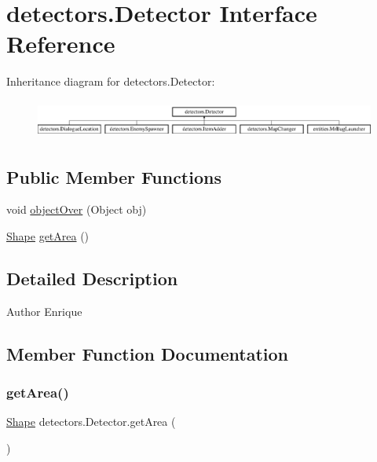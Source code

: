 \hypertarget{interfacedetectors_1_1_detector}{}\section{detectors.\+Detector Interface Reference}
\label{interfacedetectors_1_1_detector}
Inheritance diagram for detectors.\+Detector\+:\begin{figure}[H]
\begin{center}
\leavevmode
\includegraphics[height=1.287356cm]{interfacedetectors_1_1_detector}
\end{center}
\end{figure}
\subsection*{Public Member Functions}
\begin{DoxyCompactItemize}
\item 
void \mbox{\hyperlink{interfacedetectors_1_1_detector_ab35eeb78e8216f8100d4651993668d44}{object\+Over}} (Object obj)
\item 
\mbox{\hyperlink{classorg_1_1newdawn_1_1slick_1_1geom_1_1_shape}{Shape}} \mbox{\hyperlink{interfacedetectors_1_1_detector_a0b2ecb13c6db0ff6a02e57c193bcf8b2}{get\+Area}} ()
\end{DoxyCompactItemize}


\subsection{Detailed Description}
\begin{DoxyAuthor}{Author}
Enrique 
\end{DoxyAuthor}


\subsection{Member Function Documentation}
\mbox{\label{interfacedetectors_1_1_detector_a0b2ecb13c6db0ff6a02e57c193bcf8b2}} 
\subsubsection{\texorpdfstring{get\+Area()}{getArea()}}
{\footnotesize\ttfamily \mbox{\hyperlink{classorg_1_1newdawn_1_1slick_1_1geom_1_1_shape}{Shape}} detectors.\+Detector.\+get\+Area (\begin{DoxyParamCaption}{ }\end{DoxyParamCaption})}



